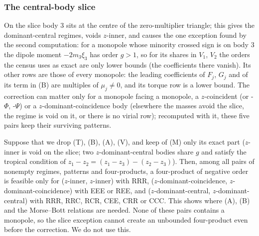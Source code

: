 \subsubsection{The central-body slice}\label{d5-slice}
On the slice body $3$ sits at the centre of the zero-multiplier triangle; this gives the
dominant-central regimes, voids $z$-inner, and causes the one exception found by the second
computation: for a monopole whose minority crossed sign is on body $3$ the dipole moment
$-2m_3\xi_3$ has order $g>1$, so for its shares in $V_1$, $V_2$ the orders the census uses as exact
are only lower bounds (the coefficients there vanish).  Its other rows are those of every
monopole: the leading coefficients of $F_j$, $G_j$ and of its term in (B) are multiples of
$\mu_j\ne0$, and its torque row is a lower bound.  The correction can matter only for a monopole
facing a monopole, a $z$-coincident (or -$\Phi$, -$\Psi$) or a $z$-dominant-coincidence body
(elsewhere the masses avoid the slice, the regime is void on it, or there is no virial row);
recomputed with it, these five pairs keep their surviving patterns.

\begin{remark}\label{d5-lem-ablation}
Suppose that we drop (T), (B), (A), (V), and keep of (M) only its exact part ($z$-inner is void
on the slice; two $z$-dominant-central bodies share $g$ and satisfy the tropical condition of
$z_1-z_2=(z_1-z_3)-(z_2-z_3)$).  Then, among all pairs of nonempty regimes, patterns and
four-products, a four-product of negative order is feasible only for ($z$-inner, $z$-inner) with
RRR, ($z$-dominant-coincidence, $z$-dominant-coincidence) with EEE or REE, and
($z$-dominant-central, $z$-dominant-central) with RRR, RRC, RCR, CEE, CRR or CCC.  This shows
where (A), (B) and the Morse--Bott relations are needed.  None of these pairs contains a monopole,
so the slice exception cannot create an unbounded four-product even before the correction.  We do
not use this.
\end{remark}

